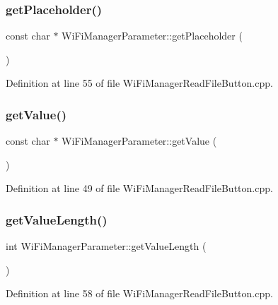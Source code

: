 \subsubsection{\texorpdfstring{get\+Placeholder()}{getPlaceholder()}}
{\footnotesize\ttfamily const char $\ast$ Wi\+Fi\+Manager\+Parameter\+::get\+Placeholder (\begin{DoxyParamCaption}{ }\end{DoxyParamCaption})}



Definition at line 55 of file Wi\+Fi\+Manager\+Read\+File\+Button.\+cpp.

\mbox{\label{class_wi_fi_manager_parameter_a23d23709f466ef1c3c2535a39016ec0f}} 
\subsubsection{\texorpdfstring{get\+Value()}{getValue()}}
{\footnotesize\ttfamily const char $\ast$ Wi\+Fi\+Manager\+Parameter\+::get\+Value (\begin{DoxyParamCaption}{ }\end{DoxyParamCaption})}



Definition at line 49 of file Wi\+Fi\+Manager\+Read\+File\+Button.\+cpp.

\mbox{\label{class_wi_fi_manager_parameter_a51715af23f9c067a73cc45fab7953606}} 
\subsubsection{\texorpdfstring{get\+Value\+Length()}{getValueLength()}}
{\footnotesize\ttfamily int Wi\+Fi\+Manager\+Parameter\+::get\+Value\+Length (\begin{DoxyParamCaption}{ }\end{DoxyParamCaption})}



Definition at line 58 of file Wi\+Fi\+Manager\+Read\+File\+Button.\+cpp.

